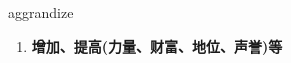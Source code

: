 
\begin{frame}
{\huge aggrandize}
\begin{center}
\begin{enumerate}\Large
  \item \textbf{增加、提高(力量、财富、地位、声誉)等}
\end{enumerate}
\end{center}
\end{frame}
